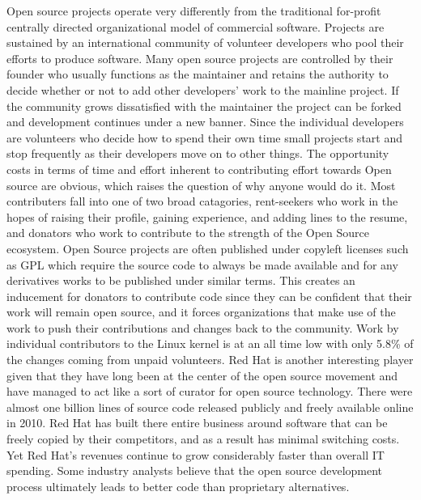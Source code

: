 Open source projects operate very differently from the traditional for-profit centrally directed organizational model of commercial software.
Projects are sustained by an international community of volunteer developers who pool their efforts to produce software.\autocite[191]{buxmann2012software}
Many open source projects are controlled by their founder who usually functions as the maintainer and retains the authority to decide whether or not to add other developers' work to the mainline project.
If the community grows dissatisfied with the maintainer the project can be forked and development continues under a new banner.
Since the individual developers are volunteers who decide how to spend their own time small projects start and stop frequently as their developers move on to other things.\autocite[197]{buxmann2012software}
The opportunity costs in terms of time and effort inherent to contributing effort towards Open source are obvious, which raises the question of why anyone would do it.
Most contributers fall into one of two broad catagories, rent-seekers who work in the hopes of raising their profile, gaining experience, and adding lines to the resume, and donators who work to contribute to the strength of the Open Source ecosystem.\autocite[198]{buxmann2012software}
Open Source projects are often published under copyleft licenses such as GPL which require the source code to always be made available and for any derivatives works to be published under similar terms.
This creates an inducement for donators to contribute code since they can be confident that their work will remain open source, and it forces organizations that make use of the work to push their contributions and changes back to the community.\autocite[198]{buxmann2012software}
Work by individual contributors to the Linux kernel is at an all time low with only 5.8\% of the changes coming from unpaid volunteers.\autocite[]{KernelDevelopment2015}
Red Hat is another interesting player given that they have long been at the center of the open source movement and have managed to act like a sort of curator for open source technology.\autocite[]{OptimismInnovation}
There were almost one billion lines of source code released publicly and freely available online in 2010.\autocite[]{OptimismInnovation}
Red Hat has built there entire business around software that can be freely copied by their competitors, and as a result has minimal switching costs.
Yet Red Hat's revenues continue to grow considerably faster than overall IT spending.\autocite[]{OptimismInnovation}
Some industry analysts believe that the open source development process ultimately leads to better code than proprietary alternatives.\autocite[]{OptimismInnovation}

